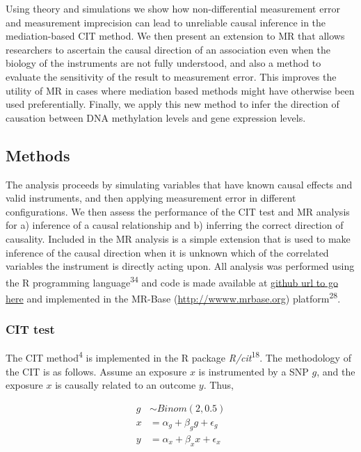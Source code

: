\documentclass[]{article}
\begin{document}
Using theory and simulations we show how non-differential measurement
error and measurement imprecision can lead to unreliable causal
inference in the mediation-based CIT method. We then present an
extension to MR that allows researchers to ascertain the causal
direction of an association even when the biology of the instruments are
not fully understood, and also a method to evaluate the sensitivity of
the result to measurement error. This improves the utility of MR in
cases where mediation based methods might have otherwise been used
preferentially. Finally, we apply this new method to infer the direction
of causation between DNA methylation levels and gene expression levels.

\subsection{Methods}\label{methods}

The analysis proceeds by simulating variables that have known causal
effects and valid instruments, and then applying measurement error in
different configurations. We then assess the performance of the CIT test
and MR analysis for a) inference of a causal relationship and b)
inferring the correct direction of causality. Included in the MR
analysis is a simple extension that is used to make inference of the
causal direction when it is unknown which of the correlated variables
the instrument is directly acting upon. All analysis was performed using
the R programming language\textsuperscript{34} and code is made
available at \href{}{github url to go here} and implemented in the
MR-Base (\url{http://wwww.mrbase.org}) platform\textsuperscript{28}.

\subsubsection{CIT test}\label{cit-test}

The CIT method\textsuperscript{4} is implemented in the R package
\emph{R/cit}\textsuperscript{18}. The methodology of the CIT is as
follows. Assume an exposure \(x\) is instrumented by a SNP \(g\), and
the exposure \(x\) is causally related to an outcome \(y\). Thus,

\[
\begin{aligned}
g & \sim Binom(2, 0.5) \\
x & = \alpha_g + \beta_g g + \epsilon_g \\
y & = \alpha_x + \beta_x x + \epsilon_x \\
\end{aligned}
\]
\end{document}
